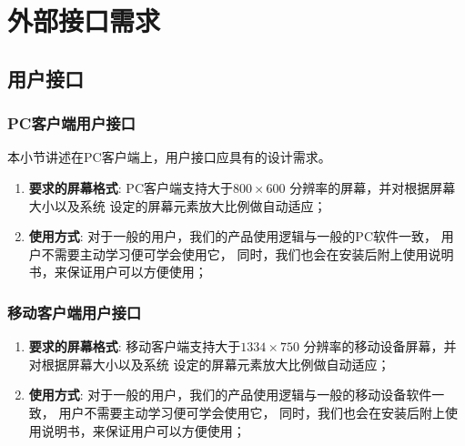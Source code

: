 \section{外部接口需求}
\subsection{用户接口}
\label{ssec:ui}

\subsubsection{PC客户端用户接口} %
本小节讲述在PC客户端上，用户接口应具有的设计需求。

\begin{enumerate}
	\item \textbf{要求的屏幕格式}:
		PC客户端支持大于$800 \times 600$ 分辨率的屏幕，并对根据屏幕大小以及系统
		设定的屏幕元素放大比例做自动适应；
	\item \textbf{使用方式}:
		对于一般的用户，我们的产品使用逻辑与一般的PC软件一致，
			用户不需要主动学习便可学会使用它，
		同时，我们也会在安装后附上使用说明书，来保证用户可以方便使用；
\end{enumerate}



\subsubsection{移动客户端用户接口} %

\begin{enumerate}
	\item \textbf{要求的屏幕格式}:
		移动客户端支持大于$1334 \times 750$ 分辨率的移动设备屏幕，并对根据屏幕大小以及系统
		设定的屏幕元素放大比例做自动适应；
	\item \textbf{使用方式}:
		对于一般的用户，我们的产品使用逻辑与一般的移动设备软件一致，
			用户不需要主动学习便可学会使用它，
		同时，我们也会在安装后附上使用说明书，来保证用户可以方便使用；
\end{enumerate}

\iffalse
{}

